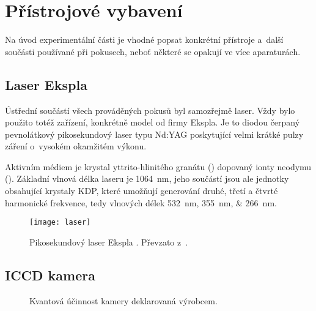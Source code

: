 \chapter{Přístrojové vybavení}
\label{sec:instruments}
Na úvod experimentální části je vhodné popsat konkrétní přístroje
a~další součásti používané při pokusech,
neboť některé se opakují ve více aparaturách.

\section{Laser Ekspla }
\label{sec:instruments-laser}
Ústřední součástí všech prováděných pokusů byl samozřejmě laser.
Vždy bylo použito totéž zařízení, konkrétně model 
od firmy Ekspla.
Je to diodou čerpaný pevnolátkový pikosekundový laser typu Nd:YAG
poskytující velmi krátké pulzy záření o~vysokém okamžitém výkonu.

Aktivním médiem je krystal yttrito-hlinitého granátu ()
dopovaný ionty neodymu ().
Základní vlnová délka laseru je \SI{1064}{\nano\metre},
jeho součástí jsou ale jednotky obsahující krystaly KDP,
které umožňují generování druhé, třetí a čtvrté harmonické frekvence,
tedy vlnových délek \SIlist{532; 355; 266}{\nano\metre}.\autocite{wiki-ndyag}

\begin{figure}[htp]
	\centering
	\texttt{[image: laser]}
	\caption{Pikosekundový laser Ekspla .
		Převzato z~.}
	\label{fig:instruments-laser}
\end{figure}

\section{ICCD kamera }
\label{sec:instruments-iccd}

\begin{figure}[htp]
	\centering
	
	\caption{Kvantová účinnost kamery deklarovaná výrobcem.}
	\label{fig:instruments-cameraeff}
\end{figure}
